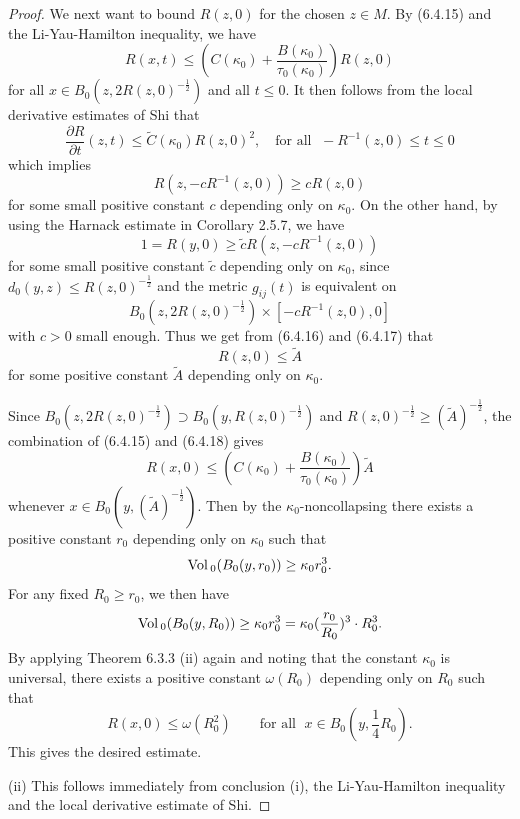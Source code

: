 \begin{proof}
We next want to bound $R(z,0)$ for the chosen $z\in M$. By
(6.4.15) and the Li-Yau-Hamilton inequality, we have
$$
R(x,t)\le (C(\kappa_0)+\frac{B(\kappa_0)}{\tau_0(\kappa_0)})R(z,0)
$$
for all $x\in B_0(z,2R(z,0)^{-\frac{1}{2}})$ and all $t\le 0$. It
then follows from the local derivative estimates of Shi that
$$
\frac{\partial R}{\partial t}(z,t)
\le\widetilde{C}(\kappa_0)R(z,0)^2,\quad \mbox{for all }\;
-R^{-1}(z,0)\leq t\leq 0
$$
which implies \begin{equation}
R(z,-cR^{-1}(z,0))\ge cR(z,0)  %
\end{equation} for some small positive constant $c$ depending only on
$\kappa_0$. On the other hand, by using the Harnack estimate in
Corollary 2.5.7, we have \begin{equation}
1=R(y,0)\ge\widetilde{c}R(z,-cR^{-1}(z,0)) %
\end{equation} for some small positive constant $\widetilde{c}$ depending
only on $\kappa_0$, since $d_0(y,z)\le R(z,0)^{-\frac{1}{2}}$ and
the metric $g_{ij}(t)$ is equivalent on
$$
B_0(z,2R(z,0)^{-\frac{1}{2}})\times[-cR^{-1}(z,0),0]
$$
with $c>0$ small enough. Thus we get from (6.4.16) and (6.4.17)
that \begin{equation}
R(z,0)\le\widetilde{A} %
\end{equation} for some positive constant $\widetilde{A}$ depending only on
$\kappa_0$.

Since $B_0(z,2R(z,0)^{-\frac{1}{2}})\supset
B_0(y,R(z,0)^{-\frac{1}{2}})$ and $R(z,0)^{-\frac{1}{2}}\ge
(\widetilde{A})^{-\frac{1}{2}}$, the combination of (6.4.15) and
(6.4.18) gives \begin{equation} R(x,0)\le
(C(\kappa_0)+\frac{B(\kappa_0)}{\tau_0(\kappa_0)})
\widetilde{A}  %
\end{equation} whenever $x\in B_0(y,(\widetilde{A})^{-\frac{1}{2}})$. Then by
the $\kappa_0$-noncollapsing there exists a positive constant
$r_0$ depending only on $\kappa_0$ such that
$$
{\rm Vol}\,_0(B_0(y,r_0))\ge \kappa_0r_0^3.
$$
For any fixed $R_0\ge r_0$, we then have
$$
{\rm Vol}\,_0(B_0(y,R_0))\ge \kappa_0r_0^3
=\kappa_0(\frac{r_0}{R_0})^3\cdot R_0^3.
$$
By applying Theorem 6.3.3 (ii) again and noting that the constant
$\kappa_0$ is universal, there exists a positive constant
$\omega(R_0)$ depending only on $R_0$ such that
$$
R(x,0)\le\omega(R_0^2)\qquad \mbox{for all }\; x\in
B_0(y,\frac{1}{4}R_0).
$$
This gives the desired estimate.

\medskip
(ii) This follows immediately from  conclusion (i), the
Li-Yau-Hamilton inequality and the local derivative estimate of
Shi.
\end{proof}

